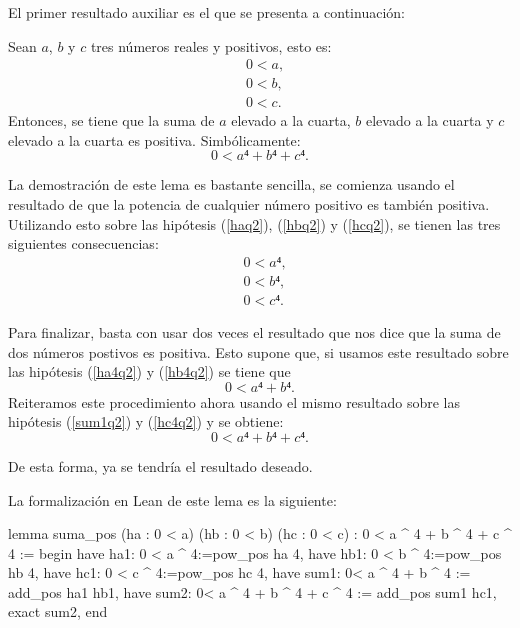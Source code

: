 El primer resultado auxiliar es el que se presenta a continuación:

\begin{lema}\label{lemasuma}
  Sean \(a\), \(b\) y \(c\) tres números reales y positivos, esto es:
  \begin{align}
    &0<a, \label{haq2}\tag{ha}\\
    &0<b, \label{hbq2}\tag{hb}\\
    &0<c. \label{hcq2}\tag{hc}
  \end{align}
  Entonces, se tiene que la suma de \(a\) elevado a la cuarta, \(b\)
  elevado a la cuarta y \(c\) elevado a la cuarta es positiva.
  Simbólicamente:
  \begin{equation}
    0<a⁴+b⁴+c⁴.
  \end{equation}
\end{lema}
\begin{demostracion}
  La demostración de este lema es bastante sencilla, se comienza
  usando el resultado de que la potencia de cualquier número
  positivo es también positiva. Utilizando esto sobre las hipótesis
  (\ref{haq2}), (\ref{hbq2}) y (\ref{hcq2}), se tienen las tres
  siguientes consecuencias:
  \begin{align}
    &0<a⁴, \label{ha4q2}\tag{ha1}\\
    &0<b⁴, \label{hb4q2}\tag{hb1}\\
    &0<c⁴. \label{hc4q2}\tag{hc1}
  \end{align}

  Para finalizar, basta con usar dos veces el resultado que nos
  dice que la suma de dos números postivos es positiva. Esto supone
  que, si usamos este resultado sobre las hipótesis (\ref{ha4q2})
  y (\ref{hb4q2}) se tiene que
  \begin{equation}\label{sum1q2}\tag{sum1}
    0<a⁴+b⁴.
  \end{equation}
  Reiteramos este procedimiento ahora usando el mismo resultado sobre
  las hipótesis (\ref{sum1q2}) y (\ref{hc4q2}) y se obtiene:
  \begin{equation}\tag{sum2}
    0<a⁴+b⁴+c⁴.
  \end{equation}

  De esta forma, ya se tendría el resultado deseado.
\end{demostracion}

La formalización en Lean de este lema es la siguiente:
\begin{leancode}
lemma suma_pos (ha : 0 < a) (hb : 0 < b) (hc : 0 < c) :
0 < a ^ 4 + b ^ 4 + c ^ 4 :=
begin
  have ha1: 0 < a ^ 4:=pow_pos ha 4,
  have hb1: 0 < b ^ 4:=pow_pos hb 4,
  have hc1: 0 < c ^ 4:=pow_pos hc 4,
  have sum1: 0< a ^ 4 + b ^ 4 := add_pos ha1 hb1,
  have sum2: 0< a ^ 4 + b ^ 4 + c ^ 4 := add_pos sum1 hc1,
  exact sum2,
end
\end{leancode}

